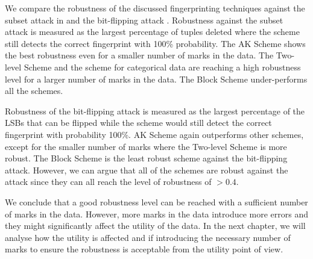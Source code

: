 We compare the robustness of the discussed fingerprinting techniques against the subset attack in  and the bit-flipping attack .
Robustness against the subset attack is measured as the largest percentage of tuples deleted where the scheme still detects the correct fingerprint with 100\% probability.
The AK Scheme shows the best robustness even for a smaller number of marks in the data. The Two-level Scheme and the scheme for categorical data are reaching a high robustness level for a larger number of marks in the data. The Block Scheme under-performs all the schemes.

Robustness of the bit-flipping attack is measured as the largest percentage of the LSBs that can be flipped while the scheme would still detect the correct fingerprint with probability 100\%.
AK Scheme again outperforms other schemes, except for the smaller number of marks where the Two-level Scheme is more robust. The Block Scheme is the least robust scheme against the bit-flipping attack. However, we can argue that all of the schemes are robust against the attack since they can all reach the level of robustness of $>0.4$.

We conclude that a good robustness level can be reached with a sufficient number of marks in the data. However, more marks in the data introduce more errors and they might significantly affect the utility of the data. In the next chapter, we will analyse how the utility is affected and if introducing the necessary number of marks to ensure the robustness is acceptable from the utility point of view.
